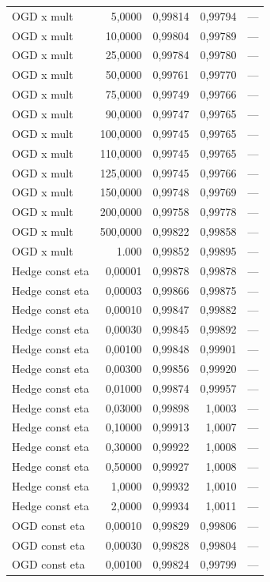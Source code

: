 {\begin{longtable}{@{}lrrrl@{}}
OGD x mult & 5,0000 & 0,99814 & 0,99794 & --- \\
OGD x mult & 10,0000 & 0,99804 & 0,99789 & --- \\
OGD x mult & 25,0000 & 0,99784 & 0,99780 & --- \\
OGD x mult & 50,0000 & 0,99761 & 0,99770 & --- \\
OGD x mult & 75,0000 & 0,99749 & 0,99766 & --- \\
OGD x mult & 90,0000 & 0,99747 & 0,99765 & --- \\
OGD x mult & 100,0000 & 0,99745 & 0,99765 & --- \\
OGD x mult & 110,0000 & 0,99745 & 0,99765 & --- \\
OGD x mult & 125,0000 & 0,99745 & 0,99766 & --- \\
OGD x mult & 150,0000 & 0,99748 & 0,99769 & --- \\
OGD x mult & 200,0000 & 0,99758 & 0,99778 & --- \\
OGD x mult & 500,0000 & 0,99822 & 0,99858 & --- \\
OGD x mult & 1.000 & 0,99852 & 0,99895 & --- \\
Hedge const eta & 0,00001 & 0,99878 & 0,99878 & --- \\
Hedge const eta & 0,00003 & 0,99866 & 0,99875 & --- \\
Hedge const eta & 0,00010 & 0,99847 & 0,99882 & --- \\
Hedge const eta & 0,00030 & 0,99845 & 0,99892 & --- \\
Hedge const eta & 0,00100 & 0,99848 & 0,99901 & --- \\
Hedge const eta & 0,00300 & 0,99856 & 0,99920 & --- \\
Hedge const eta & 0,01000 & 0,99874 & 0,99957 & --- \\
Hedge const eta & 0,03000 & 0,99898 & 1,0003 & --- \\
Hedge const eta & 0,10000 & 0,99913 & 1,0007 & --- \\
Hedge const eta & 0,30000 & 0,99922 & 1,0008 & --- \\
Hedge const eta & 0,50000 & 0,99927 & 1,0008 & --- \\
Hedge const eta & 1,0000 & 0,99932 & 1,0010 & --- \\
Hedge const eta & 2,0000 & 0,99934 & 1,0011 & --- \\
OGD const eta & 0,00010 & 0,99829 & 0,99806 & --- \\
OGD const eta & 0,00030 & 0,99828 & 0,99804 & --- \\
OGD const eta & 0,00100 & 0,99824 & 0,99799 & --- \\

\end{longtable}}
